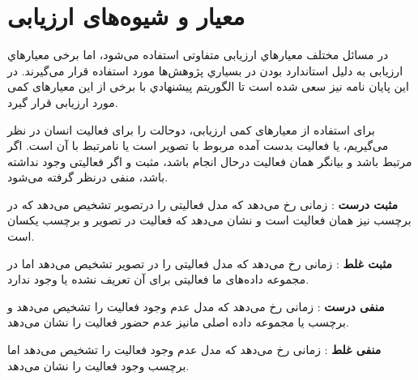 \section{‌معیار و شیوه‌های ارزیابی} \label{meyar_shive_piyade}
 در مسائل مختلف معیارهاي ارزیابی متفاوتی استفاده می‌شود، اما برخی معیارهاي ارزیابی به دلیل استاندارد بودن در بسیاري پژوهش‌ها مورد استفاده قرار می‌گیرند. در این پایان نامه نیز سعی شده است تا الگوریتم پیشنهادي با برخی از این معیارهای کمی مورد ارزیابی قرار گیرد.
 
 برای استفاده از معیار‌های کمی ارزیابی،‌ دوحالت را برای فعالیت انسان در نظر می‌گیریم،‌ یا فعالیت بدست آمده مربوط با تصویر است یا نامرتبط با آن است. اگر مرتبط باشد و بیانگر همان فعالیت درحال انجام باشد، مثبت و اگر فعالیتی وجود نداشته باشد، منفی درنظر گرفته می‌شود.
 
\textbf{مثبت درست}
 : زمانی رخ می‌دهد که مدل فعالیتی را درتصویر تشخیص می‌دهد که در برچسب نیز همان فعالیت است و نشان می‌دهد که فعالیت در تصویر و برچسب یکسان است.
 
\textbf{مثبت غلط}
: زمانی رخ می‌دهد که مدل فعالیتی را در تصویر تشخیص می‌دهد اما در مجموعه داده‌های ما فعالیتی برای آن تعریف نشده یا وجود ندارد.

\textbf{منفی درست}
: زمانی رخ می‌دهد که مدل عدم وجود فعالیت را تشخیص می‌دهد و برچسب یا مجموعه داده اصلی مانیز عدم حضور فعالیت را نشان می‌دهد.

  \textbf{منفی غلط}
  : زمانی رخ می‌دهد که مدل عدم وجود فعالیت را تشخیص می‌دهد اما برچسب وجود فعالیت را نشان می‌دهد.
  
